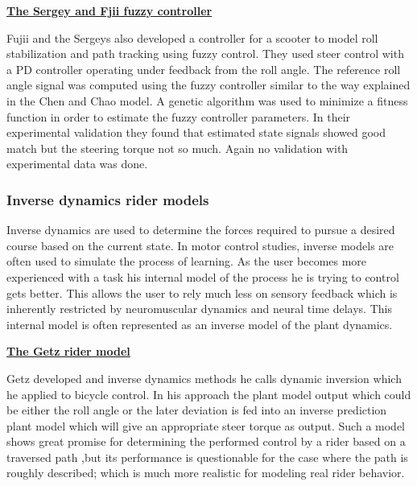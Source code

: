 \bigbreak
\underline{\textbf{The Sergey and Fjii fuzzy controller\cite{sergey2004model}}}
\newline
\par
Fujii and the Sergeys also developed a controller for a scooter to model roll stabilization and path tracking using fuzzy control. They used steer control with a PD controller operating under feedback from the roll angle. The reference roll angle signal was computed using the fuzzy controller similar to the way explained in the Chen and Chao model. A genetic algorithm was used to minimize a fitness function in order to estimate the fuzzy controller parameters.  In their experimental validation they found that estimated state signals showed good match but the steering torque not so much. Again no validation with experimental data was done.

\subsubsection{Inverse dynamics rider models}
Inverse dynamics are used to determine the forces required to pursue a desired course based on the current state. In motor control studies, inverse models are often used to simulate the process of learning. As the user becomes more experienced with a task his internal model of the process he is trying to control gets better. This allows the user to rely much less on sensory feedback which is inherently restricted by neuromuscular dynamics and neural time delays. This internal model is often represented as an inverse model of the plant dynamics. 

\bigbreak
\underline{\textbf{The Getz rider model\cite{getz1995internal,getz_marsden}}}
\newline
\par
Getz developed and inverse dynamics methods he calls dynamic inversion which he applied to bicycle control. In his approach the plant model output which could be either the roll angle or the later deviation is fed into an inverse prediction plant model which will give an appropriate steer torque as output. Such a model shows great promise for determining the performed control by a rider based on a traversed path ,but its performance is questionable for the case where the path is roughly described; which is much more realistic for modeling real rider behavior.

